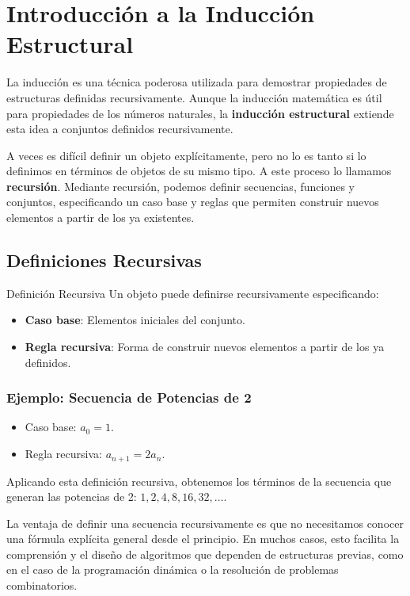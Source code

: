 \section{Introducción a la Inducción Estructural}

La inducción es una técnica poderosa utilizada para demostrar propiedades de estructuras definidas recursivamente. Aunque la inducción matemática es útil para propiedades de los números naturales, la \textbf{inducción estructural} extiende esta idea a conjuntos definidos recursivamente.

A veces es difícil definir un objeto explícitamente, pero no lo es tanto si lo definimos en términos de objetos de su mismo tipo. A este proceso lo llamamos \textbf{recursión}. Mediante recursión, podemos definir secuencias, funciones y conjuntos, especificando un caso base y reglas que permiten construir nuevos elementos a partir de los ya existentes.


\subsection{Definiciones Recursivas}
\begin{definitionblock}{Definición Recursiva}
Un objeto puede definirse recursivamente especificando:
\begin{itemize}
    \item \textbf{Caso base}: Elementos iniciales del conjunto.
    \item \textbf{Regla recursiva}: Forma de construir nuevos elementos a partir de los ya definidos.
\end{itemize}
\end{definitionblock}
\subsubsection*{Ejemplo: Secuencia de Potencias de 2}
\begin{itemize}
    \item Caso base: $a_0 = 1$.
    \item Regla recursiva: $a_{n+1} = 2a_n$.
\end{itemize}
\noindent Aplicando esta definición recursiva, obtenemos los términos de la secuencia que generan las potencias de 2: $1, 2, 4, 8, 16, 32, \dots$.

La ventaja de definir una secuencia recursivamente es que no necesitamos conocer una fórmula explícita general desde el principio. En muchos casos, esto facilita la comprensión y el diseño de algoritmos que dependen de estructuras previas, como en el caso de la programación dinámica o la resolución de problemas combinatorios.


